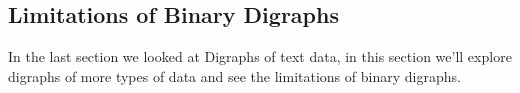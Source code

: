 \documentclass[12pt,a4paper]{article}
\begin{document}
\pagebreak
\begin{samepage}
\subsection{Limitations of Binary Digraphs}
In the last section we looked at Digraphs of text data, in this section we'll explore digraphs of more types of data and see the limitations of binary digraphs. 
\begin{figure}[!h]
    \centering
\end{figure}
\end{samepage}
\end{document}
